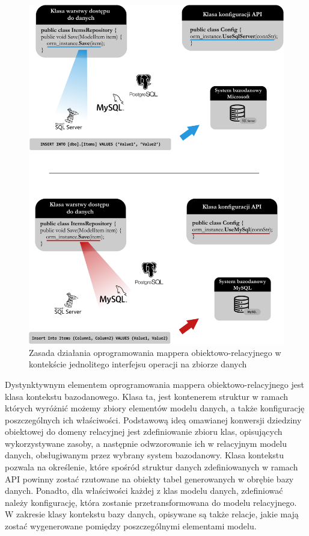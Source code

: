 \begin{figure}[ht]
 \centering
  \includegraphics[width=1\linewidth]{rys02/orm-wyjasnienie}
 \caption{Zasada działania oprogramowania mappera obiektowo-relacyjnego w kontekście jednolitego interfejsu operacji na zbiorze danych}
 \label{fig:orm-wyjasnienie}
\end{figure}

Dystynktywnym elementem oprogramowania mappera obiektowo-relacyjnego jest klasa kontekstu bazodanowego. Klasa ta, jest kontenerem struktur w ramach których wyróżnić możemy zbiory elementów modelu danych, a także konfigurację poszczególnych ich właściwości. Podstawową ideą omawianej konwersji dziedziny obiektowej do domeny relacyjnej jest zdefiniowanie zbioru klas, opisujących wykorzystywane zasoby, a następnie odwzorowanie ich w relacyjnym modelu danych, obsługiwanym przez wybrany system bazodanowy. Klasa kontekstu pozwala na określenie, które spośród struktur danych zdefiniowanych w ramach API powinny zostać rzutowane na obiekty tabel generowanych w obrębie bazy danych. Ponadto, dla właściwości każdej z klas modelu danych, zdefiniować należy konfigurację, która zostanie przetransformowana do modelu relacyjnego. W zakresie klasy kontekstu bazy danych, opisywane są także relacje, jakie mają zostać wygenerowane pomiędzy poszczególnymi elementami modelu.

